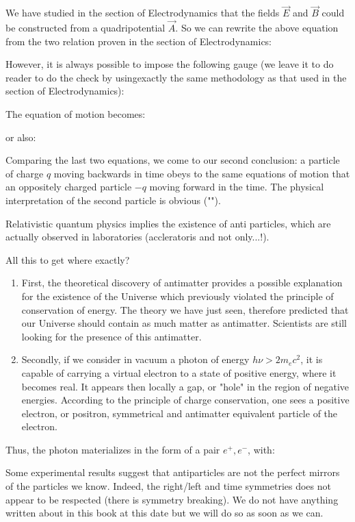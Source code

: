 	We have studied in the section of Electrodynamics that the fields $\vec{E}$ and $\vec{B}$ could be constructed from a quadripotential $\vec{A}$. So we can rewrite the above equation from the two relation proven in the section of Electrodynamics:
	
	However, it is always possible to impose the following gauge (we leave it to do reader to do the check by usingexactly the same methodology as that used in the section of Electrodynamics):
	
	The equation of motion becomes:
	
	or also:
	
	Comparing the last two equations, we come to our second conclusion: a particle of charge $q$ moving backwards in time obeys to the same equations of  motion that an oppositely charged particle $-q$ moving forward in the time. The physical interpretation of the second particle is obvious ("").

	Relativistic quantum physics implies the existence of anti particles, which are actually observed in laboratories (accleratoris and not only...!).

	All this to get where exactly?
	\begin{enumerate}
		\item First, the theoretical discovery of antimatter provides a possible explanation for the existence of the Universe which previously violated the principle of conservation of energy. The theory we have just seen, therefore predicted that our Universe should contain as much matter as antimatter. Scientists are still looking for the presence of this antimatter.

		\item Secondly, if we consider in vacuum a photon of energy $h\nu>2m_ec^2$, it is capable of carrying a virtual electron to a state of positive energy, where it becomes real. It appears then locally a gap, or "hole" in the region of negative energies. According to the principle of charge conservation, one sees a positive electron, or positron, symmetrical and antimatter equivalent particle of the electron.
	\end{enumerate}
	Thus, the photon materializes in the form of a pair $e^+,e^{-}$, with:
	
	\begin{tcolorbox}[title=Remark,colframe=black,arc=10pt]
	Some experimental results suggest that antiparticles are not the perfect mirrors of the particles we know. Indeed, the right/left and time symmetries does not appear to be respected (there is symmetry breaking). We do not have anything written about in this book at this date but we will do so as soon as we can.
	\end{tcolorbox}
	
